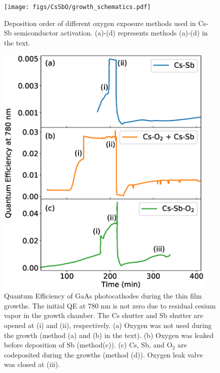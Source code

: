 \begin{figure}
	\centering
	\texttt{[image: figs/CsSbO/growth\_schematics.pdf]}
	\caption{Deposition order of different oxygen exposure methods used in Cs-Sb semiconductor activation. (a)-(d) represents methods (a)-(d) in the text.}
	\label{fig_growth_schematics}
\end{figure}

\begin{figure}
	\centering
	\includegraphics*[width=300pt]{figs/CsSbO/growths_all.eps}
	\caption{Quantum Efficiency of GaAs photocathodes during the thin film growths. The initial QE at 780 nm is not zero due to residual cesium vapor in the growth chamber. The Cs shutter and Sb shutter are opened at (i) and (ii), respectively. (a) Oxygen was not used during the growth (method (a) and (b) in the text). (b) Oxygen was leaked before deposition of Sb (method(c)). (c) Cs, Sb, and O$_2$ are codeposited during the growths (method (d)). Oxygen leak valve was closed at (iii).}
	\label{fig_growth}
\end{figure}


